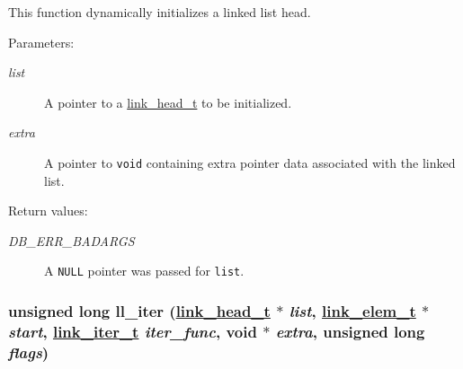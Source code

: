 This function dynamically initializes a linked list head.\begin{Desc}
\item[Parameters: ]\par
\begin{description}
\item[{\em 
list}]A pointer to a \hyperlink{group__dbprim__link_a0}{link\_\-head\_\-t} to be initialized. \item[{\em 
extra}]A pointer to {\tt void} containing extra pointer data associated with the linked list.\end{description}
\end{Desc}
\begin{Desc}
\item[Return values: ]\par
\begin{description}
\item[{\em 
DB\_\-ERR\_\-BADARGS}]A {\tt NULL} pointer was passed for {\tt list}. \end{description}
\end{Desc}
\hypertarget{group__dbprim__link_a10}{
\subsubsection[ll\_\-iter]{\setlength{\rightskip}{0pt plus 5cm}unsigned long ll\_\-iter (\hyperlink{group__dbprim__link_a0}{link\_\-head\_\-t} $\ast$ {\em list}, \hyperlink{group__dbprim__link_a1}{link\_\-elem\_\-t} $\ast$ {\em start}, \hyperlink{group__dbprim__link_a2}{link\_\-iter\_\-t} {\em iter\_\-func}, void $\ast$ {\em extra}, unsigned long {\em flags})}}
\label{group__dbprim__link_a10}


